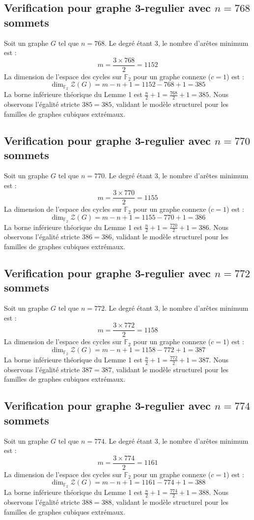 \documentclass[11pt,a4paper]{article}
\begin{document}
\subsection{Verification pour graphe 3-regulier avec $n=768$ sommets}
Soit un graphe $G$ tel que $n = 768$. Le degré étant 3, le nombre d'arêtes minimum est :
$$ m = \frac{3 \times 768}{2} = 1152 $$
La dimension de l'espace des cycles sur $\mathbb{F}_2$ pour un graphe connexe ($c=1$) est :
$$ \dim_{\mathbb{F}_2} \mathcal{Z}(G) = m - n + 1 = 1152 - 768 + 1 = 385 $$
La borne inférieure théorique du Lemme 1 est $\frac{n}{2} + 1 = \frac{768}{2} + 1 = 385$.
Nous observons l'égalité stricte $385 = 385$, validant le modèle structurel pour les familles de graphes cubiques extrémaux.

\subsection{Verification pour graphe 3-regulier avec $n=770$ sommets}
Soit un graphe $G$ tel que $n = 770$. Le degré étant 3, le nombre d'arêtes minimum est :
$$ m = \frac{3 \times 770}{2} = 1155 $$
La dimension de l'espace des cycles sur $\mathbb{F}_2$ pour un graphe connexe ($c=1$) est :
$$ \dim_{\mathbb{F}_2} \mathcal{Z}(G) = m - n + 1 = 1155 - 770 + 1 = 386 $$
La borne inférieure théorique du Lemme 1 est $\frac{n}{2} + 1 = \frac{770}{2} + 1 = 386$.
Nous observons l'égalité stricte $386 = 386$, validant le modèle structurel pour les familles de graphes cubiques extrémaux.

\subsection{Verification pour graphe 3-regulier avec $n=772$ sommets}
Soit un graphe $G$ tel que $n = 772$. Le degré étant 3, le nombre d'arêtes minimum est :
$$ m = \frac{3 \times 772}{2} = 1158 $$
La dimension de l'espace des cycles sur $\mathbb{F}_2$ pour un graphe connexe ($c=1$) est :
$$ \dim_{\mathbb{F}_2} \mathcal{Z}(G) = m - n + 1 = 1158 - 772 + 1 = 387 $$
La borne inférieure théorique du Lemme 1 est $\frac{n}{2} + 1 = \frac{772}{2} + 1 = 387$.
Nous observons l'égalité stricte $387 = 387$, validant le modèle structurel pour les familles de graphes cubiques extrémaux.

\subsection{Verification pour graphe 3-regulier avec $n=774$ sommets}
Soit un graphe $G$ tel que $n = 774$. Le degré étant 3, le nombre d'arêtes minimum est :
$$ m = \frac{3 \times 774}{2} = 1161 $$
La dimension de l'espace des cycles sur $\mathbb{F}_2$ pour un graphe connexe ($c=1$) est :
$$ \dim_{\mathbb{F}_2} \mathcal{Z}(G) = m - n + 1 = 1161 - 774 + 1 = 388 $$
La borne inférieure théorique du Lemme 1 est $\frac{n}{2} + 1 = \frac{774}{2} + 1 = 388$.
Nous observons l'égalité stricte $388 = 388$, validant le modèle structurel pour les familles de graphes cubiques extrémaux.
\end{document}
